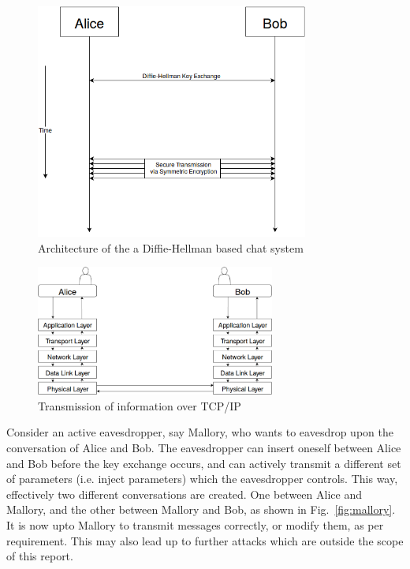\documentclass[12pt,a4paper]{article}
\begin{document}
\begin{figure}[h]
	\centering
	\vspace{0.5cm}
	\includegraphics[width=0.8\textwidth]{pictures/archi}
	\vspace{0.5cm}
	\caption{Architecture of the a Diffie-Hellman based chat system}
	\label{fig:archi}
\end{figure}

\begin{figure}[h]
	\centering
	\vspace{0.5cm}
	\includegraphics[width=0.7\textwidth]{pictures/tcpip}
	\vspace{0.5cm}
	\caption{Transmission of information over TCP/IP}
	\label{fig:tcpip}
\end{figure}

\newpage
Consider an active eavesdropper, say Mallory, who wants to eavesdrop upon the conversation of Alice and Bob. The eavesdropper can insert oneself between Alice and Bob before the key exchange occurs, and can actively transmit a different set of parameters (i.e. inject parameters) which the eavesdropper controls. This way, effectively two different conversations are created. One between Alice and Mallory, and the other between Mallory and Bob, as shown in Fig.~\ref{fig:mallory}. It is now upto Mallory to transmit messages correctly, or modify them, as per requirement. This may also lead up to further attacks which are outside the scope of this report.
\end{document}
